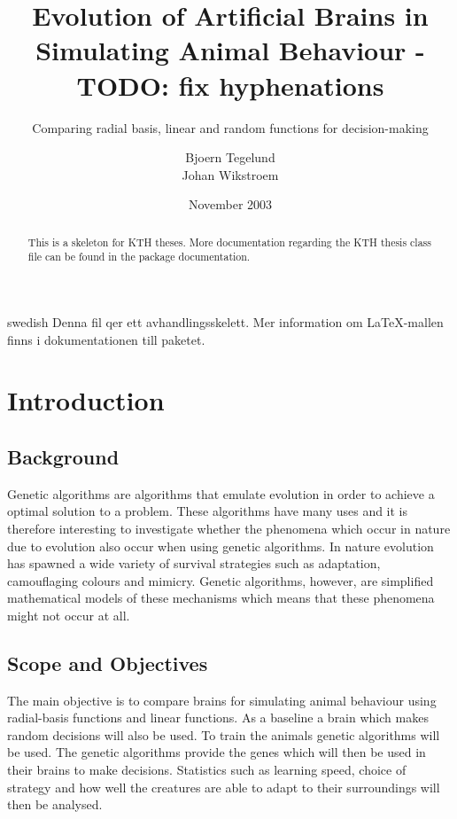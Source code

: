 \documentclass[a4paper,11pt]{kth-mag}
\title{Evolution of Artificial Brains in Simulating Animal Behaviour - TODO: fix hyphenations}
\subtitle{Comparing radial basis, linear and random functions for decision-making}
\author{Bjoern Tegelund\\Johan Wikstroem}
\date{November 2003}
\begin{document}
\frontmatter
\pagestyle{empty}
\removepagenumbers
\maketitle
{}
\begin{abstract}
  This is a skeleton for KTH theses. More documentation
  regarding the KTH thesis class file can be found in
  the package documentation.

\end{abstract}
\clearpage
\begin{foreignabstract}{swedish}
  Denna fil qer ett avhandlingsskelett.
  Mer information om \LaTeX-mallen finns i
  dokumentationen till paketet.

\end{foreignabstract}
\clearpage
\tableofcontents*
\mainmatter
\pagestyle{newchap}
\chapter{Introduction}

\section{Background}

Genetic algorithms are algorithms that emulate evolution in order to achieve a optimal solution to a problem. 
These algorithms have many uses and it is therefore interesting to investigate whether the phenomena which occur in nature due to evolution also occur when using genetic algorithms. In nature evolution has spawned a wide variety
of survival strategies such as adaptation, camouflaging colours and mimicry. Genetic algorithms, however, are 
 simplified mathematical models of these mechanisms which means that these phenomena might not occur 
at all.

\section{Scope and Objectives}

The main objective is to compare brains for simulating animal behaviour using radial-basis functions and linear functions. As a baseline a brain which makes random decisions will also be used. To train the animals genetic algorithms will be used. The genetic algorithms provide the genes which will then be used in their brains to make decisions. Statistics such as learning speed, choice of strategy and how well the creatures are able to adapt to their surroundings will then be analysed. 
\end{document}
